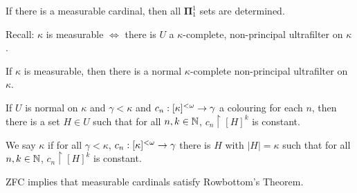 \documentclass[]{article}
\newcommand{\lom}{{<\omega}}
\newcommand{\bopi}{\bm{\Pi}}
\begin{document}
\begin{theorem*}[Martin, 1969/70]
    If there is a measurable cardinal, then all $\bopi^1_1$ sets are determined.
\end{theorem*}
\begin{defin*}
    Recall: $\kappa$ is measurable $\iff$ there is $U$ a $\kappa$-complete, non-principal ultrafilter on $\kappa$.
\end{defin*}
\begin{theorem*}
    If $\kappa$ is measurable, then there is a normal $\kappa$-complete non-principal ultrafilter on $\kappa$.
\end{theorem*}

\begin{theorem*}[Rowbottom, ES\#3]
    If $U$ is normal on $\kappa$ and $\gamma < \kappa$ and $c_n : [\kappa]^\lom \ra \gamma$ a colouring for each $n$, then there is a set $H\in U$ such that for all $n,k\in\mathbb{N}$, $c_n\restriction [H]^k$ is constant.
\end{theorem*}

We say $\kappa$  if for all $\gamma < \kappa$, $c_n:[\kappa]^\lom \ra \gamma$ there is $H$ with $|H| = \kappa$ such that for all $n,k\in\mathbb{N}$, $c_n\restriction [H]^k$ is constant.

\begin{remark*}[Summary]
    ZFC implies that measurable cardinals satisfy Rowbottom's Theorem.
\end{remark*}
\end{document}
